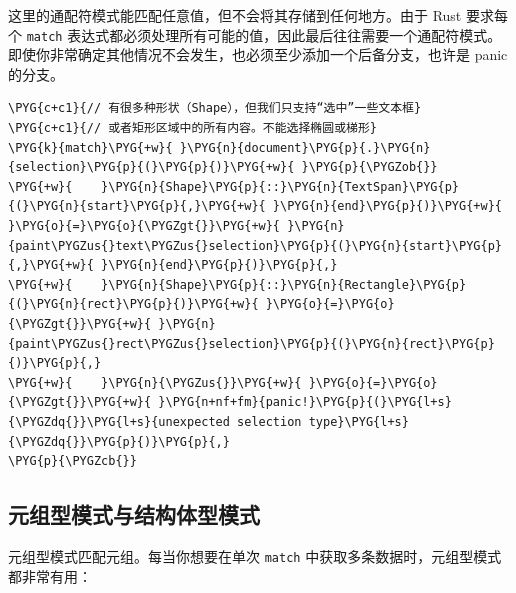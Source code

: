 这里的通配符模式能匹配任意值，但不会将其存储到任何地方。由于 Rust 要求每个 \texttt{match} 表达式都必须处理所有可能的值，因此最后往往需要一个通配符模式。即使你非常确定其他情况不会发生，也必须至少添加一个后备分支，也许是 panic 的分支。

\begin{Verbatim}[commandchars=\\\{\},breaklines=true,breakanywhere=true,fontsize=\codefont,xleftmargin=17bp]
\PYG{c+c1}{// 有很多种形状（Shape），但我们只支持“选中”一些文本框}
\PYG{c+c1}{// 或者矩形区域中的所有内容。不能选择椭圆或梯形}
\PYG{k}{match}\PYG{+w}{ }\PYG{n}{document}\PYG{p}{.}\PYG{n}{selection}\PYG{p}{(}\PYG{p}{)}\PYG{+w}{ }\PYG{p}{\PYGZob{}}
\PYG{+w}{    }\PYG{n}{Shape}\PYG{p}{::}\PYG{n}{TextSpan}\PYG{p}{(}\PYG{n}{start}\PYG{p}{,}\PYG{+w}{ }\PYG{n}{end}\PYG{p}{)}\PYG{+w}{ }\PYG{o}{=}\PYG{o}{\PYGZgt{}}\PYG{+w}{ }\PYG{n}{paint\PYGZus{}text\PYGZus{}selection}\PYG{p}{(}\PYG{n}{start}\PYG{p}{,}\PYG{+w}{ }\PYG{n}{end}\PYG{p}{)}\PYG{p}{,}
\PYG{+w}{    }\PYG{n}{Shape}\PYG{p}{::}\PYG{n}{Rectangle}\PYG{p}{(}\PYG{n}{rect}\PYG{p}{)}\PYG{+w}{ }\PYG{o}{=}\PYG{o}{\PYGZgt{}}\PYG{+w}{ }\PYG{n}{paint\PYGZus{}rect\PYGZus{}selection}\PYG{p}{(}\PYG{n}{rect}\PYG{p}{)}\PYG{p}{,}
\PYG{+w}{    }\PYG{n}{\PYGZus{}}\PYG{+w}{ }\PYG{o}{=}\PYG{o}{\PYGZgt{}}\PYG{+w}{ }\PYG{n+nf+fm}{panic!}\PYG{p}{(}\PYG{l+s}{\PYGZdq{}}\PYG{l+s}{unexpected selection type}\PYG{l+s}{\PYGZdq{}}\PYG{p}{)}\PYG{p}{,}
\PYG{p}{\PYGZcb{}}
\end{Verbatim}

\subsection{元组型模式与结构体型模式}

元组型模式匹配元组。每当你想要在单次 \texttt{match} 中获取多条数据时，元组型模式都非常有用：

